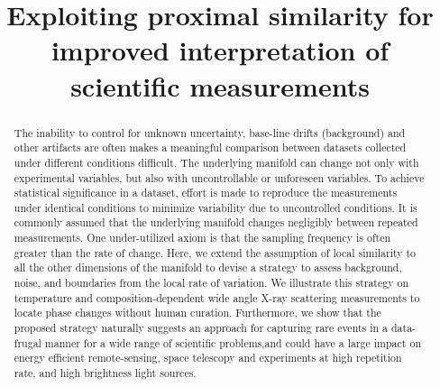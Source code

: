\documentclass[12pt]{iopart}
\begin{document}
\title[]{Exploiting proximal similarity for improved interpretation of scientific measurements}

\author{}


\begin{abstract}
The inability to control for unknown uncertainty, base-line drifts (background) and other artifacts are often makes a meaningful comparison between datasets collected under different conditions difficult.  The underlying manifold can change not only with experimental variables, but also with uncontrollable or unforeseen variables.  To achieve statistical significance in a dataset, effort is made to reproduce the measurements under identical conditions to minimize variability due to uncontrolled conditions.  It is commonly assumed that the underlying manifold changes negligibly between repeated measurements.  One under-utilized axiom is that the sampling frequency is often greater than the rate of change.  Here, we extend the assumption of local similarity to all the other dimensions of the manifold to devise a strategy to assess background, noise, and boundaries from the local rate of variation.  We illustrate this strategy on temperature and composition-dependent wide angle X-ray scattering measurements to locate phase changes without human curation.  Furthermore, we show that the proposed strategy naturally suggests an approach for capturing rare events in a data-frugal manner for a wide range of scientific problems,and could have a large impact on energy efficient remote-sensing, space telescopy and experiments at high repetition rate, and high brightness light sources.
\end{abstract}

%
%
%
% 
%
\end{document}
